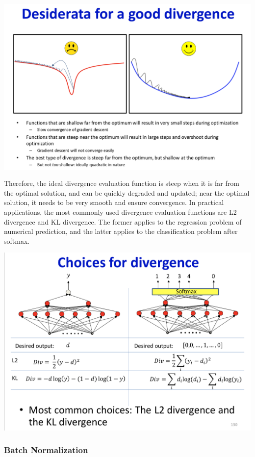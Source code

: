 \documentclass{article}
\begin{document}
	\includegraphics[scale=0.2]{102.png}
	
	Therefore, the ideal divergence evaluation function is steep when it is far from the optimal solution, and can be quickly degraded and updated; near the optimal solution, it needs to be very smooth and ensure convergence. In practical applications, the most commonly used divergence evaluation functions are L2 divergence and KL divergence. The former applies to the regression problem of numerical prediction, and the latter applies to the classification problem after softmax.
	
	\includegraphics[scale=0.2]{103.png}
	
	\subsubsection{Batch Normalization}
	
\end{document}
